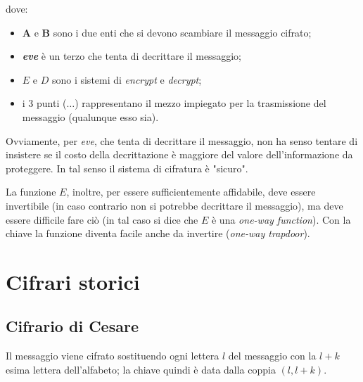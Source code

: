 \documentclass[a4paper, 11pt]{article}
\begin{document}
	
	dove:\begin{itemize}
		\item \textbf{A} e \textbf{B} sono i due enti che si devono scambiare il messaggio cifrato;
		\item \textbf{\textit{eve}} è un terzo che tenta di decrittare il messaggio;
		\item $E$ e $D$ sono i sistemi di \textit{encrypt} e \textit{decrypt};
		\item i 3 punti ($\dots$) rappresentano il mezzo impiegato per la trasmissione del messaggio (qualunque esso sia).
	\end{itemize}
	
	Ovviamente, per \textit{eve}, che tenta di decrittare il messaggio, non ha senso tentare di insistere se il costo della decrittazione è maggiore del valore dell'informazione da proteggere. In tal senso il sistema di cifratura è "sicuro". 
	
	La funzione $E$, inoltre, per essere sufficientemente affidabile, deve essere invertibile (in caso contrario non si potrebbe decrittare il messaggio), ma deve essere difficile fare ciò (in tal caso si dice che $E$ è una \textit{one-way function}). Con la chiave la funzione diventa facile anche da invertire (\textit{one-way trapdoor}). \newpage
	
	\section{Cifrari storici}
	\subsection{Cifrario di Cesare}
	Il messaggio viene cifrato sostituendo ogni lettera $l$ del messaggio con la $l+k$ esima lettera dell'alfabeto; la chiave quindi è data dalla coppia $(l, l+k)$. 
	
\end{document}
